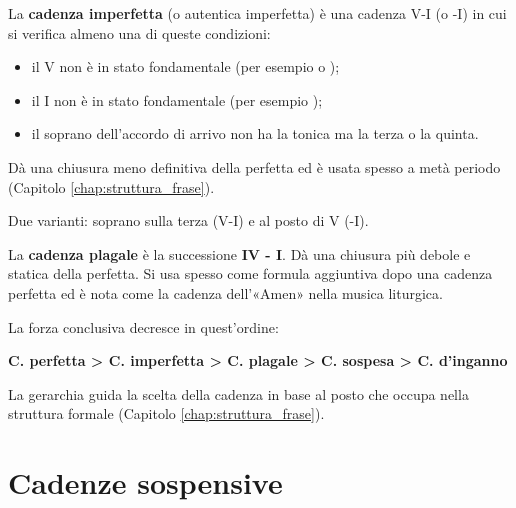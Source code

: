 \begin{definizione}
	\label{def:cadenza_imperfetta}
	La \textbf{cadenza imperfetta} (o autentica imperfetta) è una cadenza V-I (o -I) in cui si verifica almeno una di queste condizioni:
	\begin{itemize}
		\item il V non è in stato fondamentale (per esempio  o );
		\item il I non è in stato fondamentale (per esempio );
		\item il soprano dell'accordo di arrivo non ha la tonica ma la terza o la quinta.
	\end{itemize}
	Dà una chiusura meno definitiva della perfetta ed è usata spesso a metà periodo (Capitolo \ref{chap:struttura_frase}).
\end{definizione}

\begin{esempio}
	Due varianti: soprano sulla terza (V-I) e  al posto di V (-I).
\end{esempio}

\begin{definizione}
	\label{def:cadenza_plagale}
	La \textbf{cadenza plagale} è la successione \textbf{IV - I}. Dà una chiusura più debole e statica della perfetta. Si usa spesso come formula aggiuntiva dopo una cadenza perfetta ed è nota come la cadenza dell'«Amen» nella musica liturgica.
\end{definizione}

\begin{esempio}
	\label{ex:cadenza_plagale}
\end{esempio}

\begin{regola}
	\label{reg:gerarchia_cadenze}
	La forza conclusiva decresce in quest'ordine:
	\begin{center}
		\textbf{C. perfetta > C. imperfetta > C. plagale > C. sospesa > C. d'inganno}
	\end{center}
	La gerarchia guida la scelta della cadenza in base al posto che occupa nella struttura formale (Capitolo \ref{chap:struttura_frase}).
\end{regola}

\section{Cadenze sospensive}
\label{sec:cadenze_sospensive}

